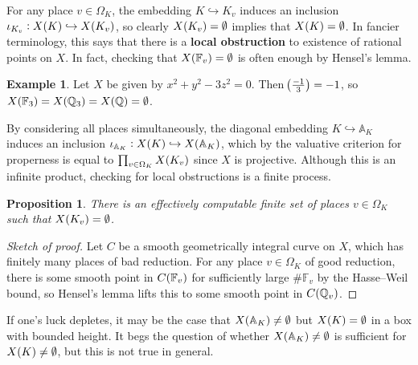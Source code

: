 \documentclass{article}
\theoremstyle{plain}
\newtheorem*{proposition}{Proposition}
\theoremstyle{definition}
\newtheorem*{example}{Example}
\renewcommand{\AA}{\mathbb{A}}
\newcommand{\FF}{\mathbb{F}}
\newcommand{\QQ}{\mathbb{Q}}
\newcommand{\br}{\!\del}
\begin{document}
For any place $ v \in \Omega_K $, the embedding $ K \hookrightarrow K_v $ induces an inclusion $ \iota_{K_v} : X\br{K} \hookrightarrow X\br{K_v} $, so clearly $ X\br{K_v} = \emptyset $ implies that $ X\br{K} = \emptyset $. In fancier terminology, this says that there is a \textbf{local obstruction} to existence of rational points on $ X $. In fact, checking that $ X\br{\FF_v} = \emptyset $ is often enough by Hensel's lemma.

\begin{example}
Let $ X $ be given by $ x^2 + y^2 - 3z^2 = 0 $. Then $ \br{\tfrac{-1}{3}} = -1 $, so $ X\br{\FF_3} = X\br{\QQ_3} = X\br{\QQ} = \emptyset $.
\end{example}

By considering all places simultaneously, the diagonal embedding $ K \hookrightarrow \AA_K $ induces an inclusion $ \iota_{\AA_K} : X\br{K} \hookrightarrow X\br{\AA_K} $, which by the valuative criterion for properness is equal to $ \prod_{v \in \Omega_K} X\br{K_v} $ since $ X $ is projective. Although this is an infinite product, checking for local obstructions is a finite process.

\begin{proposition}
There is an effectively computable finite set of places $ v \in \Omega_K $ such that $ X\br{K_v} = \emptyset $.
\end{proposition}

\begin{proof}[Sketch of proof]
Let $ C $ be a smooth geometrically integral curve on $ X $, which has finitely many places of bad reduction. For any place $ v \in \Omega_K $ of good reduction, there is some smooth point in $ C\br{\FF_v} $ for sufficiently large $ \#\FF_v $ by the Hasse--Weil bound, so Hensel's lemma lifts this to some smooth point in $ C\br{\QQ_v} $.
\end{proof}

If one's luck depletes, it may be the case that $ X\br{\AA_K} \ne \emptyset $ but $ X\br{K} = \emptyset $ in a box with bounded height. It begs the question of whether $ X\br{\AA_K} \ne \emptyset $ is sufficient for $ X\br{K} \ne \emptyset $, but this is not true in general.

\pagebreak
\end{document}

